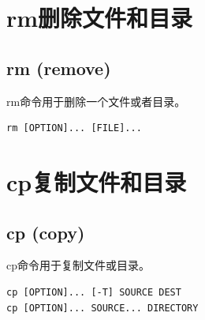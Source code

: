 \documentclass[12pt, openany, oneside]{book}
\begin{document}
\newpage

\section{rm删除文件和目录}

\subsection{rm (remove)}

rm命令用于删除一个文件或者目录。

\vspace{-0.5cm}

\begin{lstlisting}
rm [OPTION]... [FILE]...
\end{lstlisting}

\begin{table}[H]
    \centering
    \caption{rm参数说明}
\end{table}

\newpage

\section{cp复制文件和目录}

\subsection{cp (copy)}

cp命令用于复制文件或目录。

\vspace{-0.5cm}

\begin{lstlisting}
cp [OPTION]... [-T] SOURCE DEST
cp [OPTION]... SOURCE... DIRECTORY
\end{lstlisting}
\end{document}
